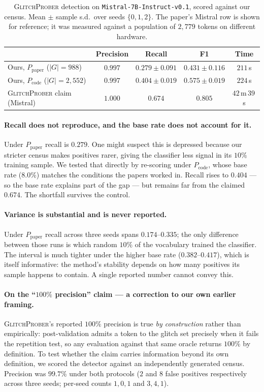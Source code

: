 \documentclass[11pt,a4paper]{article}
\newcommand{\gp}{\textsc{GlitchProber}}
\newcommand{\Ppaper}{$P_{\mathrm{paper}}$}
\newcommand{\Pcode}{$P_{\mathrm{code}}$}
\begin{document}
\begin{table}[h]
\centering
\caption{\gp{} detection on \texttt{Mistral-7B-Instruct-v0.1}, scored against our
census. Mean $\pm$ sample s.d.\ over seeds $\{0,1,2\}$. The paper's Mistral row is
shown for reference; it was measured against a population of $2{,}779$ tokens on
different hardware.}
\label{tab:detect}
\begin{tabular}{lcccc}
\toprule
& Precision & Recall & F1 & Time \\
\midrule
Ours, \Ppaper{} ($|G| = 988$)      & $0.997$ & $0.279 \pm 0.091$ & $0.431 \pm 0.116$ & $211$\,s \\
Ours, \Pcode{} ($|G| = 2{,}552$)   & $0.997$ & $0.404 \pm 0.019$ & $0.575 \pm 0.019$ & $224$\,s \\
\midrule
\gp{} claim (Mistral)              & $1.000$ & $0.674$ & $0.805$ & $42$\,m\,$39$\,s \\
\bottomrule
\end{tabular}
\end{table}

\paragraph{Recall does not reproduce, and the base rate does not account for it.}
Under \Ppaper{} recall is $0.279$. One might suspect this is depressed because our
stricter census makes positives rarer, giving the classifier less signal in its
$10\%$ training sample. We tested that directly by re-scoring under \Pcode{},
whose base rate ($8.0\%$) matches the conditions the papers worked in. Recall
rises to $0.404$ --- so the base rate explains part of the gap --- but remains far
from the claimed $0.674$. The shortfall survives the control.

\paragraph{Variance is substantial and is never reported.} Under \Ppaper{} recall
across three seeds spans $0.174$--$0.335$; the only difference between those runs
is which random $10\%$ of the vocabulary trained the classifier. The interval is
much tighter under the higher base rate ($0.382$--$0.417$), which is itself
informative: the method's stability depends on how many positives its sample
happens to contain. A single reported number cannot convey this.

\paragraph{On the ``$100\%$ precision'' claim --- a correction to our own earlier
framing.} \gp{}'s reported $100\%$ precision is true \emph{by construction} rather
than empirically: post-validation admits a token to the glitch set precisely when
it fails the repetition test, so any evaluation against that same oracle returns
$100\%$ by definition. To test whether the claim carries information beyond its
own definition, we scored the detector against an independently generated census.
Precision was $99.7\%$ under both protocols ($2$ and $8$ false positives
respectively across three seeds; per-seed counts $1,0,1$ and $3,4,1$).
\end{document}
